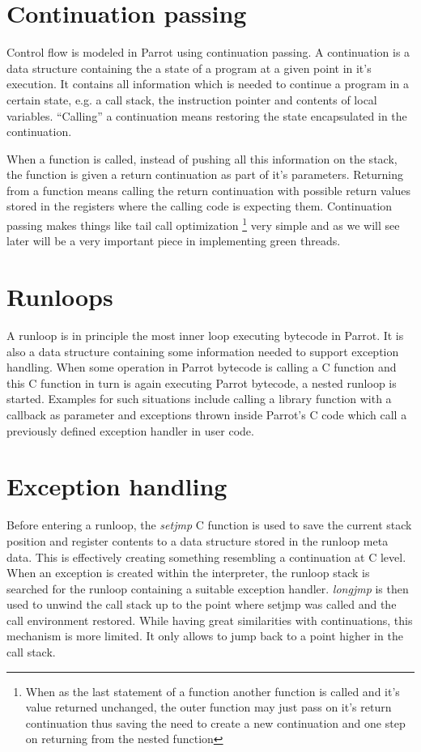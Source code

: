\documentclass[bachelor,english]{hgbthesis}
\begin{document}
\section{Continuation passing}

Control flow is modeled in Parrot using continuation passing. A continuation is a data structure containing the a state of a program at a given point in it's execution. It contains all information which is needed to continue a program in a certain state, e.g. a call stack, the instruction pointer and contents of local variables. ``Calling'' a continuation means restoring the state encapsulated in the continuation.

When a function is called, instead of pushing all this information on the stack, the function is given a return continuation as part of it's parameters. Returning from a function means calling the return continuation with possible return values stored in the registers where the calling code is expecting them. Continuation passing makes things like tail call optimization \footnote{When as the last statement of a function another function is called and it's value returned unchanged, the outer function may just pass on it's return continuation thus saving the need to create a new continuation and one step on returning from the nested function} very simple and as we will see later will be a very important piece in implementing green threads.

\section{Runloops}

A runloop is in principle the most inner loop executing bytecode in Parrot. It is also a data structure containing some information needed to support exception handling. When some operation in Parrot bytecode is calling a C function and this C function in turn is again executing Parrot bytecode, a nested runloop is started. Examples for such situations include calling a library function with a callback as parameter and exceptions thrown inside Parrot's C code which call a previously defined exception handler in user code.

\section{Exception handling}

Before entering a runloop, the \textit{setjmp} C function is used to save the current stack position and register contents to a data structure stored in the runloop meta data. This is effectively creating something resembling a continuation at C level. When an exception is created within the interpreter, the runloop stack is searched for the runloop containing a suitable exception handler. \textit{longjmp} is then used to unwind the call stack up to the point where setjmp was called and the call environment restored. While having great similarities with continuations, this mechanism is more limited. It only allows to jump back to a point higher in the call stack.
\end{document}
